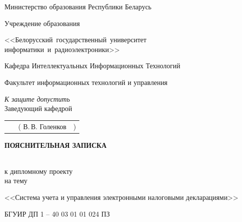 \documentclass[14pt,a4paper]{reportmod}
\begin{document}
\thispagestyle{empty}
\begin{titlepage}
\begin{center}
Министерство образования Республики Беларусь

\vspace{0.6cm}

Учреждение образования

<<Белорусский~государственный~университет информатики~и~радиоэлектроники>>

\vspace{0.6cm}

Кафедра Интеллектуальных Информационных Технологий

\vspace{0.6cm}

Факультет информационных технологий и управления

\begin{flushright}
 \textit{К защите допустить}\\
 Заведующий кафедрой
\end{flushright}

\begin{flushright}
\begin{tabular}{p{10.5cm}p{4cm}r}
 ~ & ( В.\,В. Голенков & )
\end{tabular}
\end{flushright}

\vspace{1cm}

\begin{Large}\textbf{ПОЯСНИТЕЛЬНАЯ ЗАПИСКА}\end{Large}\\
к дипломному проекту\\
на тему


<<Система учета и управления электронными налоговыми декларациями>>

БГУИР ДП 1 -- 40 03 01 01 024 ПЗ
\end{center}


\vspace{0.6cm}


\end{titlepage}
\end{document}
